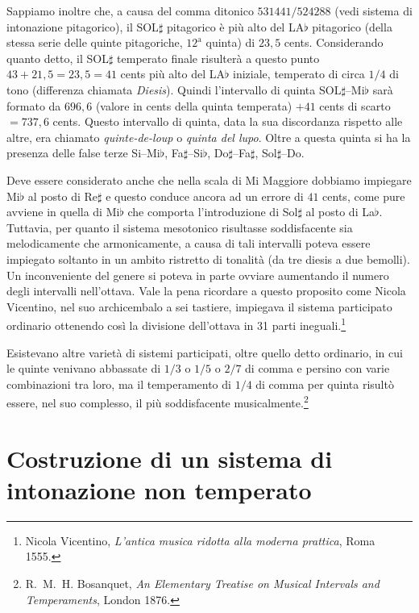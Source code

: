 Sappiamo inoltre che, a causa del comma ditonico $531441/524288$ (vedi sistema
di intonazione pitagorico), il SOL$\sharp$ pitagorico è più alto del LA$\flat$
pitagorico (della stessa serie delle quinte pitagoriche, $12^{\text{a}}$ quinta)
di $23{,}5$ cents. Considerando quanto detto, il SOL$\sharp$ temperato finale
risulterà a questo punto $43 + 21{,}5 = 23{,}5 = 41$ cents più alto del
LA$\flat$ iniziale, temperato di circa $1/4$ di tono (differenza chiamata
\emph{Diesis}). Quindi l'intervallo di quinta SOL$\sharp$--Mi$\flat$ sarà
formato da $696{,}6$ (valore in cents della quinta temperata) $+ 41$ cents di
scarto $= 737{,}6$ cents. Questo intervallo di quinta, data la sua discordanza
rispetto alle altre, era chiamato \emph{quinte-de-loup} o \emph{quinta del
lupo}. Oltre a questa quinta si ha la presenza delle false terze Si--Mi$\flat$,
Fa$\sharp$--Si$\flat$, Do$\sharp$--Fa$\sharp$, Sol$\sharp$--Do.

Deve essere considerato anche che nella scala di Mi Maggiore dobbiamo impiegare
Mi$\flat$ al posto di Re$\sharp$ e questo conduce ancora ad un errore di $41$
cents, come pure avviene in quella di Mi$\flat$ che comporta l'introduzione di
Sol$\sharp$ al posto di La$\flat$. Tuttavia, per quanto il sistema mesotonico
risultasse soddisfacente sia melodicamente che armonicamente, a causa di tali
intervalli poteva essere impiegato soltanto in un ambito ristretto di tonalità
(da tre diesis a due bemolli). Un inconveniente del genere si poteva in parte
ovviare aumentando il numero degli intervalli nell'ottava. Vale la pena
ricordare a questo proposito come Nicola Vicentino, nel suo archicembalo a sei
tastiere, impiegava il sistema participato ordinario ottenendo così la divisione
dell'ottava in 31 parti ineguali.\footnote{Nicola Vicentino, \emph{L'antica
musica ridotta alla moderna prattica}, Roma 1555.}

Esistevano altre varietà di sistemi participati, oltre quello detto ordinario,
in cui le quinte venivano abbassate di $1/3$ o $1/5$ o $2/7$ di comma e persino
con varie combinazioni tra loro, ma il temperamento di $1/4$ di comma per quinta
risultò essere, nel suo complesso, il più soddisfacente
musicalmente.\footnote{R.~M.~H. Bosanquet, \emph{An Elementary Treatise on
Musical Intervals and Temperaments}, London 1876.}

\section{Costruzione di un sistema di intonazione non temperato}

